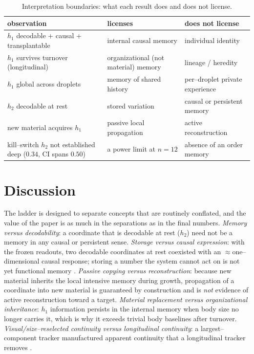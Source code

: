 \documentclass[11pt]{article}
\begin{document}
\begin{table}[t]\centering\small
\caption{Interpretation boundaries: what each result does and does not license.}
\label{tab:boundaries}
\begin{tabular}{@{}p{4.4cm}p{4.4cm}p{4.4cm}@{}}\toprule observation & licenses & does not license\\\midrule
$h_1$ decodable + causal + transplantable & internal causal memory & individual identity\\
$h_1$ survives turnover (longitudinal) & organizational (not material) memory & lineage / heredity\\
$h_1$ global across droplets & memory of shared history & per--droplet private experience\\
$h_2$ decodable at rest & stored variation & causal or persistent memory\\
new material acquires $h_1$ & passive local propagation & active reconstruction\\
kill--switch $h_2$ not established deep ($0.34$, CI spans $0.50$) & a power limit at $n{=}12$ & absence of an order memory\\\bottomrule
\end{tabular}
\end{table}

\section{Discussion}
The ladder is designed to separate concepts that are routinely conflated, and the value of the paper is as much in
the separations as in the final numbers. \emph{Memory versus decodability}: a coordinate that is decodable at rest
($h_2$) need not be a memory in any causal or persistent sense. \emph{Storage versus causal expression}: with the
frozen readouts, two decodable coordinates at rest coexisted with an $\approx$one--dimensional causal response;
storing a number the system cannot act on is not yet functional memory \citep{pearl2009}. \emph{Passive copying
versus reconstruction}: because new material inherits the local intensive memory during growth, propagation of a
coordinate into new material is guaranteed by construction and is \emph{not} evidence of active reconstruction
toward a target. \emph{Material replacement versus organizational inheritance}: $h_1$ information persists in the
internal memory when body size no longer carries it, which is why it exceeds trivial body baselines after turnover.
\emph{Visual/size--reselected continuity versus longitudinal continuity}: a largest--component tracker manufactured
apparent continuity that a longitudinal tracker removes \citep{jaqaman2008,rosenfeld1966}.
\end{document}
